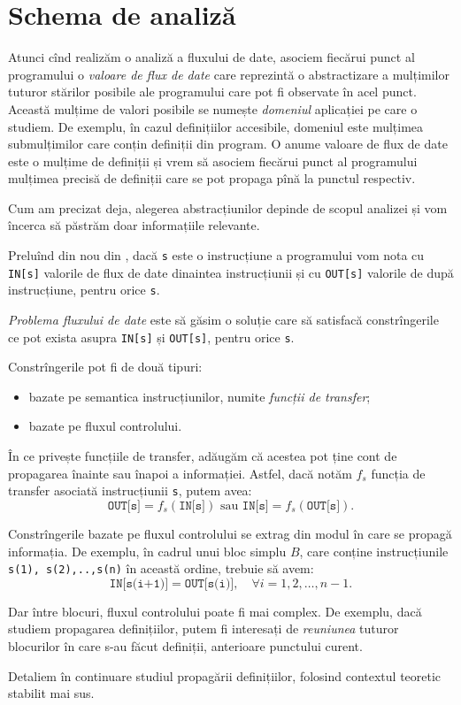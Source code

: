 
\section{Schema de analiză}
\label{sec:schema}

Atunci cînd realizăm o analiză a fluxului de date, asociem fiecărui
punct al programului o \emph{valoare de flux de date} care reprezintă
o abstractizare a mulțimilor tuturor stărilor posibile ale programului
care pot fi observate în acel punct. Această mulțime de valori posibile
se numește \emph{domeniul} aplicației pe care o studiem. De exemplu,
în cazul definițiilor accesibile, domeniul este mulțimea submulțimilor
care conțin definiții din program. O anume valoare de flux de date este
o mulțime de definiții și vrem să asociem fiecărui punct al programului
mulțimea precisă de definiții care se pot propaga pînă la punctul respectiv.

Cum am precizat deja, alegerea abstracțiunilor depinde de scopul analizei
și vom încerca să păstrăm doar informațiile relevante.

Preluînd din nou din \cite{aho}, dacă \texttt{s} este o instrucțiune a
programului vom nota cu \texttt{IN[s]} valorile de flux de date dinaintea
instrucțiunii și cu \texttt{OUT[s]} valorile de după instrucțiune,
pentru orice \texttt{s}.

\emph{Problema fluxului de date} este să găsim o soluție care să satisfacă
constrîngerile ce pot exista asupra \texttt{IN[s]} și \texttt{OUT[s]}, pentru
orice \texttt{s}.

Constrîngerile pot fi de două tipuri:
\begin{itemize}
\item bazate pe semantica instrucțiunilor, numite \emph{funcții de transfer};
\item bazate pe fluxul controlului.
\end{itemize}

În ce privește funcțiile de transfer, adăugăm că acestea pot ține cont
de propagarea înainte sau înapoi a informației. Astfel, dacă notăm $ f_s $
funcția de transfer asociată instrucțiunii \texttt{s}, putem avea:
\[
  \texttt{OUT[s]} = f_s(\texttt{IN[s]}) \text{ sau } %
  \texttt{IN[s]} = f_s(\texttt{OUT[s]}).
\]

Constrîngerile bazate pe fluxul controlului se extrag din modul
în care se propagă informația. De exemplu, în cadrul unui bloc simplu $ B $,
care conține instrucțiunile \texttt{s(1), s(2),..,s(n)} în această ordine,
trebuie să avem:
\[
  \texttt{IN[s(i+1)]} = \texttt{OUT[s(i)]}, \quad \forall i = 1, 2, \dots, n-1.
\]

Dar între blocuri, fluxul controlului poate fi mai complex. De exemplu,
dacă studiem propagarea definițiilor, putem fi interesați de \emph{reuniunea}
tuturor blocurilor în care s-au făcut definiții, anterioare punctului curent.

\vspace{0.5cm}

Detaliem în continuare studiul propagării definițiilor, folosind contextul
teoretic stabilit mai sus.

